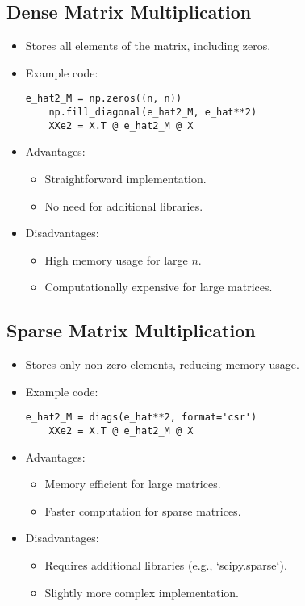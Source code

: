 \documentclass{article}
\begin{document}
\subsection{Dense Matrix Multiplication}
\begin{itemize}
    \item Stores all elements of the matrix, including zeros.
    \item Example code:
    \begin{lstlisting}[caption={Dense Matrix Example}]
    e_hat2_M = np.zeros((n, n))
    np.fill_diagonal(e_hat2_M, e_hat**2)
    XXe2 = X.T @ e_hat2_M @ X
    \end{lstlisting}
    \item Advantages:
        \begin{itemize}
            \item Straightforward implementation.
            \item No need for additional libraries.
        \end{itemize}
    \item Disadvantages:
        \begin{itemize}
            \item High memory usage for large \(n\).
            \item Computationally expensive for large matrices.
        \end{itemize}
\end{itemize}

\subsection{Sparse Matrix Multiplication}
\begin{itemize}
    \item Stores only non-zero elements, reducing memory usage.
    \item Example code:
    \begin{lstlisting}[caption={Sparse Matrix Example}]
    e_hat2_M = diags(e_hat**2, format='csr')
    XXe2 = X.T @ e_hat2_M @ X
    \end{lstlisting}
    \item Advantages:
        \begin{itemize}
            \item Memory efficient for large matrices.
            \item Faster computation for sparse matrices.
        \end{itemize}
    \item Disadvantages:
        \begin{itemize}
            \item Requires additional libraries (e.g., `scipy.sparse`).
            \item Slightly more complex implementation.
        \end{itemize}
\end{itemize}
\end{document}
